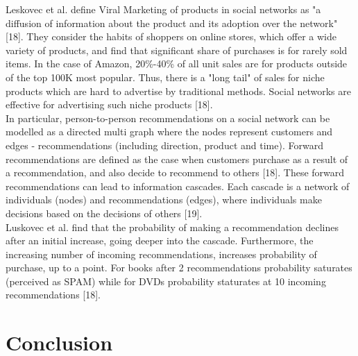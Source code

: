 \documentclass[conference,letterpaper]{IEEEtran}
\begin{document}
Leskovec et al. define Viral Marketing of products in social networks as "a diffusion of information about the product and its adoption over the network" [18].
They consider the habits of shoppers on online stores, which offer a wide variety of products, and find that significant share of purchases is for rarely sold items.
In the case of Amazon, 20\%-40\% of all unit sales are for products outside of the top 100K most popular. Thus, there is a "long tail" of sales for niche products which
are hard to advertise by traditional methods. Social networks are effective for advertising such niche products [18].\\
In particular, person-to-person recommendations on a social network can be modelled as a directed multi graph where the nodes represent customers and edges - recommendations (including direction, product and time).
Forward recommendations are defined as the case when customers purchase as a result of a recommendation, and also decide to recommend to others [18]. These forward
recommendations can lead to information cascades. Each cascade is a network of individuals (nodes) and recommendations (edges), where individuals make decisions based on the decisions of others [19].\\
Luskovec et al. find that the probability of making a recommendation declines after an initial increase, going deeper into the cascade. Furthermore, the increasing number of incoming recommendations,
increases probability of purchase, up to a point. For books after 2 recommendations probability saturates (perceived as SPAM) while for DVDs probability staturates at 10 incoming recommendations [18]. \\




\section{Conclusion}

\end{document}
